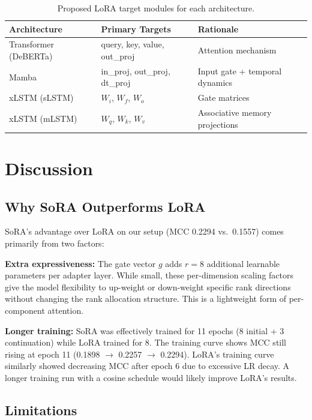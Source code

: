 \documentclass[12pt,a4paper]{article}
\theoremstyle{definition}
\begin{document}
\begin{table}[H]
\centering
\caption{Proposed LoRA target modules for each architecture.}
\label{tab:task3_targets}
\begin{tabular}{lll}
\toprule
\textbf{Architecture} & \textbf{Primary Targets} & \textbf{Rationale} \\
\midrule
Transformer (DeBERTa) & query, key, value, out\_proj & Attention mechanism \\
Mamba & in\_proj, out\_proj, dt\_proj & Input gate + temporal dynamics \\
xLSTM (sLSTM) & $W_i$, $W_f$, $W_o$ & Gate matrices \\
xLSTM (mLSTM) & $W_q$, $W_k$, $W_v$ & Associative memory projections \\
\bottomrule
\end{tabular}
\end{table}

\section{Discussion}

\subsection{Why SoRA Outperforms LoRA}

SoRA's advantage over LoRA on our setup (MCC 0.2294 vs.\ 0.1557) comes primarily from two factors:

\textbf{Extra expressiveness:} The gate vector $g$ adds $r=8$ additional learnable parameters per adapter layer. While small, these per-dimension scaling factors give the model flexibility to up-weight or down-weight specific rank directions without changing the rank allocation structure. This is a lightweight form of per-component attention.

\textbf{Longer training:} SoRA was effectively trained for 11 epochs (8 initial + 3 continuation) while LoRA trained for 8. The training curve shows MCC still rising at epoch 11 (0.1898 $\to$ 0.2257 $\to$ 0.2294). LoRA's training curve similarly showed decreasing MCC after epoch 6 due to excessive LR decay. A longer training run with a cosine schedule would likely improve LoRA's results.

\subsection{Limitations}
\end{document}
